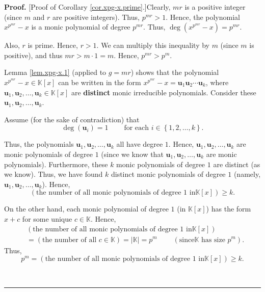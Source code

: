 \documentclass[numbers=enddot,12pt,final,onecolumn,notitlepage]{scrartcl}%
\theoremstyle{definition}
\newenvironment{proof}[1][Proof]{\noindent\textbf{#1.} }{\ \rule{0.5em}{0.5em}}
\begin{document}
\begin{proof}
[Proof of Corollary \ref{cor.xpg-x.prime}.]Clearly, $mr$ is a positive integer
(since $m$ and $r$ are positive integers). Thus, $p^{mr}>1$. Hence, the
polynomial $x^{p^{mr}}-x$ is a monic polynomial of degree $p^{mr}$. Thus,
$\deg\left(  x^{p^{mr}}-x\right)  =p^{mr}$.

Also, $r$ is prime. Hence, $r>1$. We can multiply this inequality by $m$
(since $m$ is positive), and thus $mr>m\cdot1=m$. Hence, $p^{mr}>p^{m}$.

Lemma \ref{lem.xpg-x.1} (applied to $g=mr$) shows that the polynomial
$x^{p^{mr}}-x\in\mathbb{K}\left[  x\right]  $ can be written in the form
$x^{p^{mr}}-x=\mathbf{u}_{1}\mathbf{u}_{2}\cdots\mathbf{u}_{k}$, where
$\mathbf{u}_{1},\mathbf{u}_{2},\ldots,\mathbf{u}_{k}\in\mathbb{K}\left[
x\right]  $ are \textbf{distinct} monic irreducible polynomials. Consider
these $\mathbf{u}_{1},\mathbf{u}_{2},\ldots,\mathbf{u}_{k}$.

Assume (for the sake of contradiction) that
\begin{equation}
\deg\left(  \mathbf{u}_{i}\right)  =1\ \ \ \ \ \ \ \ \ \ \text{for each }%
i\in\left\{  1,2,\ldots,k\right\}  . \label{pf.cor.xpg-x.prime.ass1}%
\end{equation}


Thus, the polynomials $\mathbf{u}_{1},\mathbf{u}_{2},\ldots,\mathbf{u}_{k}$
all have degree $1$. Hence, $\mathbf{u}_{1},\mathbf{u}_{2},\ldots
,\mathbf{u}_{k}$ are monic polynomials of degree $1$ (since we know that
$\mathbf{u}_{1},\mathbf{u}_{2},\ldots,\mathbf{u}_{k}$ are monic polynomials).
Furthermore, these $k$ monic polynomials of degree $1$ are distinct (as we
know). Thus, we have found $k$ distinct monic polynomials of degree $1$
(namely, $\mathbf{u}_{1},\mathbf{u}_{2},\ldots,\mathbf{u}_{k}$). Hence,%
\[
\left(  \text{the number of all monic polynomials of degree }1\text{ in
}\mathbb{K}\left[  x\right]  \right)  \geq k.
\]


On the other hand, each monic polynomial of degree $1$ (in $\mathbb{K}\left[
x\right]  $) has the form $x+c$ for some unique $c\in\mathbb{K}$. Hence,
\begin{align*}
&  \left(  \text{the number of all monic polynomials of degree }1\text{ in
}\mathbb{K}\left[  x\right]  \right) \\
&  =\left(  \text{the number of all }c\in\mathbb{K}\right)  =\left\vert
\mathbb{K}\right\vert =p^{m}\ \ \ \ \ \ \ \ \ \ \left(  \text{since
}\mathbb{K}\text{ has size }p^{m}\right)  .
\end{align*}
Thus,%
\[
p^{m}=\left(  \text{the number of all monic polynomials of degree }1\text{ in
}\mathbb{K}\left[  x\right]  \right)  \geq k.
\]



\end{proof}
\end{document}
